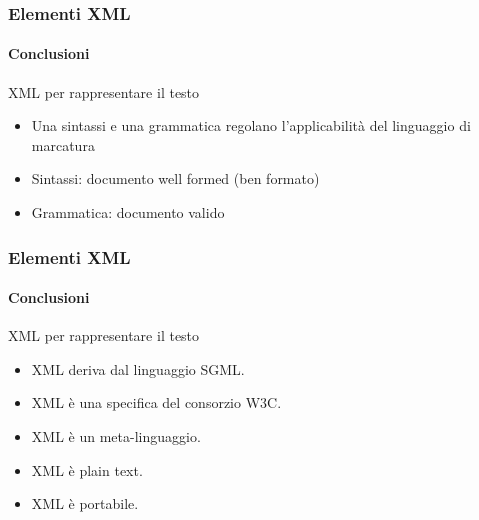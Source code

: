 \begin{frame}
    \frametitle{Elementi XML}
    \framesubtitle{Conclusioni}
    \addtocounter{nframe}{1}

    \begin{block}{XML per rappresentare il testo}
        \begin{itemize}
            \item Una sintassi e una grammatica regolano l'applicabilità del linguaggio di marcatura
            \item Sintassi: documento well formed (ben formato)
            \item Grammatica: documento valido
        \end{itemize}

    \end{block}

\end{frame}


\begin{frame}
    \frametitle{Elementi XML}
    \framesubtitle{Conclusioni}
    \addtocounter{nframe}{1}

    \begin{block}{XML per rappresentare il testo}
        \begin{itemize}
            \item XML deriva dal linguaggio SGML.
            \item XML è una specifica del consorzio W3C.
            \item XML è un meta-linguaggio.
            \item XML è plain text.
            \item XML è portabile.
        \end{itemize}

    \end{block}

\end{frame}

